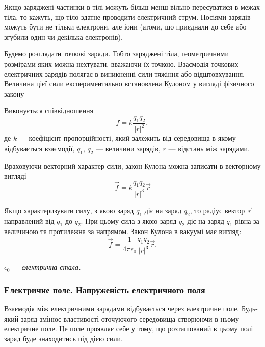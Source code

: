 Якщо заряджені частинки в тілі можуть більш менш вільно пересуватися в межах тіла, то кажуть, що тіло здатне проводити електричний струм. Носіями зарядів можуть бути не тільки електрони, але іони (атоми, що приєднали до себе або згубили один чи декілька електронів). \medskip

Будемо розглядати точкові заряди. Тобто заряджені тіла, геометричними розмірами яких можна нехтувати, вважаючи їх точкою. Взаємодія точкових електричних зарядів полягає в виникненні сили тяжіння або відштовхування. Величина цієї сили експериментально встановлена Кулоном у вигляді фізичного закону
\begin{law}[Кулона]
	Виконується співвідношення
	\begin{equation}
		f = k \frac{q_1 q_2}{|r|^2},
	\end{equation}
	де  $k$ --- коефіцієнт пропорційності, який залежить від середовища в якому відбувається взаємодії, $q_1$, $q_2$ --- величини зарядів, $r$ --- відстань між зарядами.
\end{law}

Враховуючи векторний характер сили, закон Кулона можна записати в векторному вигляді
\begin{equation}
	\vec f = k \frac{q_1 q_2}{|r|^3} \vec r
\end{equation}

Якщо характеризувати силу, з якою заряд $q_1$ діє на заряд $q_2$, то радіус вектор $\vec r$ направлений від $q_1$ до $q_2$. При цьому сила з якою заряд $q_2$ діє на заряд $q_1$ рівна за величиною та протилежна за напрямом. Закон Кулона в вакуумі має вигляд:
\begin{equation}
	\vec f = \frac{1}{4 \pi \epsilon_0} \frac{q_1q_2}{|r|^3} \vec r.
\end{equation}

\begin{definition}
	$\epsilon_0$ --- \it{електрична стала}.
\end{definition}

\subsubsection{Електричне поле. Напруженість електричного поля}

Взаємодія між електричними зарядами відбувається через електричне поле. Будь-який заряд змінює властивості оточуючого середовища створюючи в ньому електричне поле. Це поле проявляє себе у тому, що розташований в цьому полі заряд буде знаходитись під дією сили. \medskip

